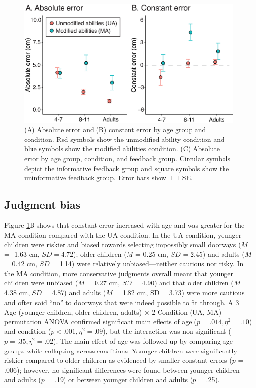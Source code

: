 \documentclass[a4paper,man,natbib,floatsintext,noextraspace]{apa6}
\begin{document}
\begin{figure}[htb!]
\centering
\includegraphics[width=1\textwidth]{error.eps}
\caption{\label{fig:error}(A) Absolute error and (B) constant error by age group and condition. Red symbols show the unmodified ability condition and blue symbols show the modified abilities condition. (C) Absolute error by age group, condition, and feedback group. Circular symbols depict the informative feedback group and square symbols show the uninformative feedback group. Error bars show ± 1 SE.}
\end{figure}

\subsection{Judgment bias}

Figure \ref{fig:error}B shows that constant error increased with age and was greater for the MA condition compared with the UA condition. In the UA condition, younger children were riskier and biased towards selecting impossibly small doorways ($M$ = -1.63 cm, $SD = 4.72$); older children ($M$ = 0.25 cm, $SD$ = 2.45) and adults ($M$ = 0.42 cm, $SD$ = 1.14) were relatively unbiased---neither cautious nor risky. In the MA condition, more conservative judgments overall meant that younger children were unbiased ($M$ = 0.27 cm, $SD$ = 4.90) and that older children ($M$ = 4.38 cm, $SD$ = 4.87) and adults ($M$ = 1.82 cm, SD = 3.73) were more cautious and often said “no” to doorways that were indeed possible to fit through. A 3 Age (younger children, older children, adults) × 2 Condition (UA, MA) permutation ANOVA confirmed significant main effects of age ($p = .014, \eta^{2} = .10$) and condition ($p < .001, \eta^{2} = .09$), but the interaction was non-significant ($p = .35, \eta^{2} = .02$). The main effect of age was followed up by comparing age groups while collapsing across conditions. Younger children were significantly riskier compared to older children as evidenced by smaller constant errors ($p$ = .006); however, no significant differences were found between younger children and adults ($p$ = .19) or between younger children and adults ($p$ = .25).
\end{document}
